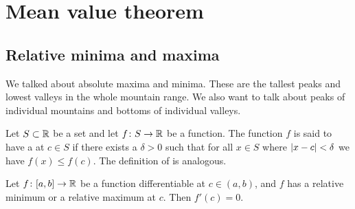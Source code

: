 
\sectionnewpage
\section{Mean value theorem}
\label{sec:mvt}


\subsection{Relative minima and maxima}

We talked about absolute maxima and minima.  These are the tallest peaks and
lowest valleys in the whole mountain range.  We also want to talk
about peaks of individual mountains and bottoms of individual valleys.

\begin{defn}
Let $S \subset {\mathbb{R}}$ be a set and
let $f \colon S \to {\mathbb{R}}$ be a function.  The function $f$ is said to have
a \emph{} at $c \in S$ if there exists a $\delta>0$
such that for all $x \in S$ where $\left\lvert {x-c} \right\rvert < \delta$
we have $f(x) \leq f(c)$.
The definition of
\emph{}
is analogous.
\end{defn}

\begin{lemma}\label{relminmax:lemma}
Let $f \colon [a,b] \to {\mathbb{R}}$ be a function differentiable at $c \in (a,b)$,
and $f$ has
a relative minimum or a relative maximum at $c$.  Then
$f'(c) = 0$.
\end{lemma}

